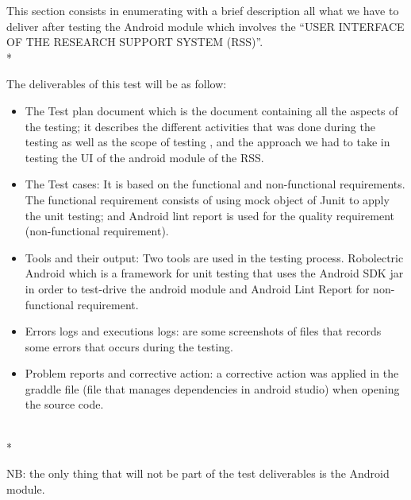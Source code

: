 This section consists in enumerating with a brief description all what we have to deliver after testing the Android module which involves the “USER INTERFACE OF THE RESEARCH SUPPORT SYSTEM (RSS)”.  \\*

The deliverables of this test will be as follow:
\begin{itemize}
        \item The Test plan document which is the document containing all the aspects of the testing; it describes the different activities that was done during the testing as well as the scope of testing , and the approach we had to take in testing the UI of the android module of the RSS.
        \item The Test cases: It is based on the functional and non-functional requirements.  The functional requirement consists of using mock object of Junit to apply the unit testing; and Android lint report is used for the quality requirement (non-functional requirement).

        \item Tools and their output: Two tools are used in the testing process. Robolectric Android which is a framework for unit testing that uses the Android SDK jar in order to test-drive the android module and  Android Lint Report for non-functional requirement.

        \item Errors logs and executions logs: are some screenshots of files that records some errors that occurs during the testing.

        \item Problem reports and corrective action: a corrective action was applied in the graddle file (file that manages dependencies in android studio) when opening the source code.     
\end{itemize}

\\*

NB: the only thing that will not be part of the test deliverables is the Android module.                                                                              